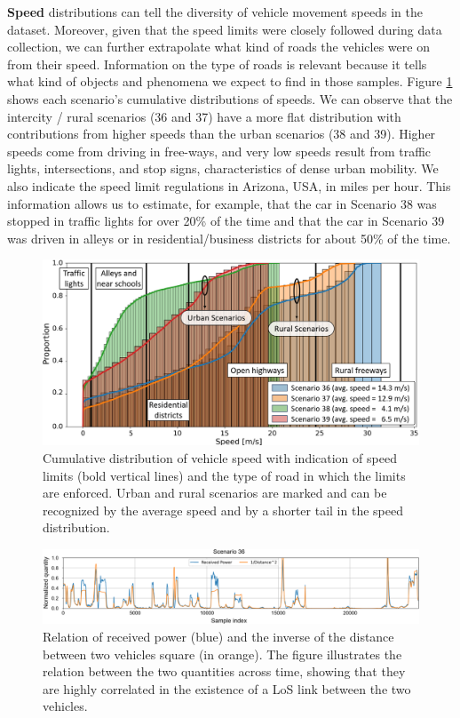 \documentclass[10pt,comsoc]{IEEEtran}
\begin{document}
\textbf{Speed} distributions can tell the diversity of vehicle movement speeds in the dataset. Moreover, given that the speed limits were closely followed during data collection, we can further extrapolate what kind of roads the vehicles were on from their speed. Information on the type of roads is relevant because it tells what kind of objects and phenomena we expect to find in those samples. Figure \ref{fig:speeds} shows each scenario's cumulative distributions of speeds. We can observe that the intercity / rural scenarios (36 and 37) have a more flat distribution with contributions from higher speeds than the urban scenarios (38 and 39). Higher speeds come from driving in free-ways, and very low speeds result from traffic lights, intersections, and stop signs, characteristics of dense urban mobility. We also indicate the speed limit regulations in Arizona, USA, in miles per hour. This information allows us to estimate, for example, that the car in Scenario 38 was stopped in traffic lights for over 20\% of the time and that the car in Scenario 39 was driven in alleys or in residential/business districts for about 50\% of the time.

\begin{figure}[t]
	\centering
	\includegraphics[width=1\columnwidth]{speed8}
	\caption{Cumulative distribution of vehicle speed with indication of speed limits (bold vertical lines) and the type of road in which the limits are enforced. Urban and rural scenarios are marked and can be recognized by the average speed and by a shorter tail in the speed distribution.}
	\label{fig:speeds}
\end{figure}


\begin{figure}[t]
	\centering
	\includegraphics[width=2.04\columnwidth]{dist_vs_pwr7}
	\caption{Relation of received power (blue) and the inverse of the distance between two vehicles square (in orange). The figure illustrates the relation between the two quantities across time, showing that they are highly correlated in the existence of a LoS link between the two vehicles.}
	\label{fig:distance_vs_power}
\end{figure}
\end{document}
